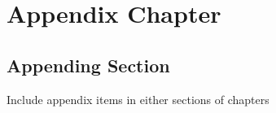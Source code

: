 \appendix

\begingroup

\chapter{Appendix Chapter}
\label{app:appendix_chapter}

\section{Appending Section}
\label{app:sec:appendix_section}
Include appendix items in either sections of chapters

\endgroup